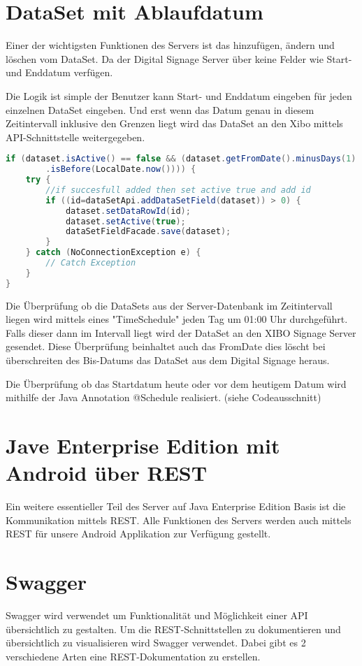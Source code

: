 \section{DataSet mit Ablaufdatum}\label{sec:datasetexpiredate}
Einer der wichtigsten Funktionen des Servers ist das hinzufügen, ändern und löschen vom DataSet. Da der Digital Signage Server über keine Felder wie Start- und Enddatum verfügen.

Die Logik ist simple der Benutzer kann Start- und Enddatum eingeben für jeden einzelnen DataSet eingeben. Und erst wenn das Datum genau in diesem Zeitintervall inklusive den Grenzen liegt wird das DataSet an den Xibo mittels API-Schnittstelle weitergegeben. 

\begin{lstlisting}[language=Java, caption={public void doCheckEvery24Hours()}]
if (dataset.isActive() == false && (dataset.getFromDate().minusDays(1)
        .isBefore(LocalDate.now()))) {
    try {
        //if succesfull added then set active true and add id
        if ((id=dataSetApi.addDataSetField(dataset)) > 0) {
            dataset.setDataRowId(id);
            dataset.setActive(true);
            dataSetFieldFacade.save(dataset);
        }
    } catch (NoConnectionException e) {
        // Catch Exception
    }
}
\end{lstlisting}

Die Überprüfung ob die DataSets aus der Server-Datenbank im Zeitintervall liegen wird mittels eines "TimeSchedule" jeden Tag um 01:00 Uhr durchgeführt. Falls dieser dann im Intervall liegt wird der DataSet an den XIBO Signage Server gesendet. Diese Überprüfung beinhaltet auch das FromDate dies löscht bei überschreiten des Bis-Datums das DataSet aus dem Digital Signage heraus. 

Die Überprüfung ob das Startdatum heute oder vor dem heutigem Datum wird mithilfe der Java Annotation @Schedule realisiert. (siehe Codeausschnitt) 

\section{Jave Enterprise Edition mit Android über REST}\label{sec:javaeeandroidrest}
Ein weitere essentieller Teil des Server auf Java Enterprise Edition Basis ist die Kommunikation mittels REST. Alle Funktionen des Servers werden auch mittels REST für unsere Android Applikation zur Verfügung gestellt. 

\section{Swagger}\label{sec:javaeeandroidrestswagger}
Swagger wird verwendet um Funktionalität und Möglichkeit einer API übersichtlich zu gestalten. Um die REST-Schnittstellen zu dokumentieren und übersichtlich zu visualisieren wird Swagger verwendet. Dabei gibt es 2 verschiedene Arten eine REST-Dokumentation zu erstellen. 


